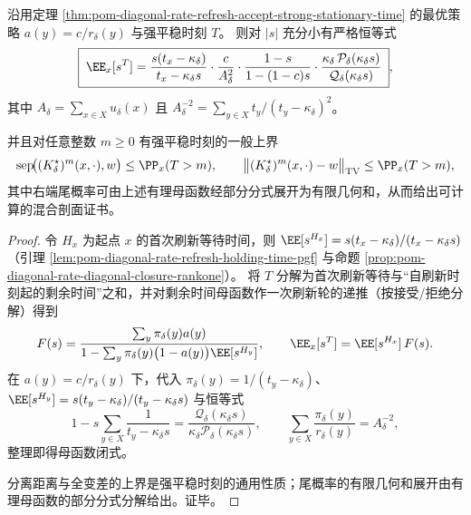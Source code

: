 \begin{theorem}\label{thm:pom-diagonal-rate-sst-pgf-Qdelta}
沿用定理 \ref{thm:pom-diagonal-rate-refresh-accept-strong-stationary-time} 的最优策略 \(a(y)=c/r_\delta(y)\) 与强平稳时刻 \(T\)。
则对 \(|s|\) 充分小有严格恒等式
\[
\boxed{\;
\EE_x[s^{T}]
=\frac{s(t_x-\kappa_\delta)}{t_x-\kappa_\delta s}\cdot
\frac{c}{A_\delta^{2}}\cdot
\frac{1-s}{1-(1-c)s}\cdot
\frac{\kappa_\delta\,\mathcal P_\delta(\kappa_\delta s)}{\mathcal Q_\delta(\kappa_\delta s)}\; } ,
\]
其中 \(A_\delta=\sum_{x\in X}u_\delta(x)\) 且 \(A_\delta^{-2}=\sum_{y\in X} t_y/(t_y-\kappa_\delta)^2\)。
\par
并且对任意整数 \(m\ge 0\) 有强平稳时刻的一般上界
\[
\mathrm{sep}\!\bigl((K^\star_\delta)^m(x,\cdot),w\bigr)\le \PP_x(T>m),
\qquad
\bigl\|(K^\star_\delta)^m(x,\cdot)-w\bigr\|_{\mathrm{TV}}\le \PP_x(T>m),
\]
其中右端尾概率可由上述有理母函数经部分分式展开为有限几何和，从而给出可计算的混合剖面证书。
\end{theorem}
\begin{proof}
令 \(H_x\) 为起点 \(x\) 的首次刷新等待时间，则 \(\EE[s^{H_x}]=s(t_x-\kappa_\delta)/(t_x-\kappa_\delta s)\)（引理 \ref{lem:pom-diagonal-rate-refresh-holding-time-pgf} 与命题 \ref{prop:pom-diagonal-rate-diagonal-closure-rankone}）。
将 \(T\) 分解为首次刷新等待与“自刷新时刻起的剩余时间”之和，并对剩余时间母函数作一次刷新轮的递推（按接受/拒绝分解）得到
\[
F(s)=\frac{\sum_y \pi_\delta(y)a(y)}{1-\sum_y\pi_\delta(y)\bigl(1-a(y)\bigr)\EE[s^{H_y}]},
\qquad \EE_x[s^T]=\EE[s^{H_x}]\,F(s).
\]
在 \(a(y)=c/r_\delta(y)\) 下，代入 \(\pi_\delta(y)=1/(t_y-\kappa_\delta)\)、
\(
\EE[s^{H_y}]=s(t_y-\kappa_\delta)/(t_y-\kappa_\delta s)
\)
与恒等式
\[
1-s\sum_{y\in X}\frac{1}{t_y-\kappa_\delta s}=\frac{\mathcal Q_\delta(\kappa_\delta s)}{\kappa_\delta\mathcal P_\delta(\kappa_\delta s)},
\qquad
\sum_{y\in X}\frac{\pi_\delta(y)}{r_\delta(y)}=A_\delta^{-2},
\]
整理即得母函数闭式。
\par
分离距离与全变差的上界是强平稳时刻的通用性质；尾概率的有限几何和展开由有理母函数的部分分式分解给出。证毕。
\end{proof}






\endinput
